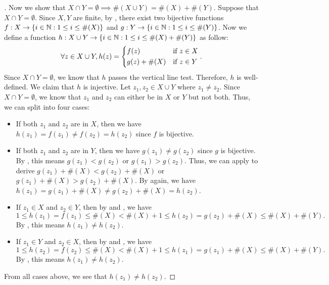\begin{proof}[]
  Now we show that \(X \cap Y = \emptyset \implies \#(X \cup Y) = \#(X) + \#(Y)\).
  Suppose that \(X \cap Y = \emptyset\).
  Since \(X, Y\) are finite, by , there exist two bijective functions \(f : X \to \left\lbrace i \in \mathbb{N} : 1 \leq i \leq \#(X)\right\rbrace\) and \(g : Y \to \left\lbrace i \in \mathbb{N} : 1 \leq i \leq \#(Y)\right\rbrace\).
  Now we define a function \(h : X \cup Y \to \left\lbrace i \in \mathbb{N} : 1 \leq i \leq \#(X) + \#(Y)\right\rbrace\) as follow:
  \[
    \forall z \in X \cup Y, h(z) = \begin{dcases}
      f(z)         & \text{if } z \in X \\
      g(z) + \#(X) & \text{if } z \in Y
    \end{dcases}.
  \]
  Since \(X \cap Y = \emptyset\), we know that \(h\) passes the vertical line test.
  Therefore, \(h\) is well-defined.
  We claim that \(h\) is injective.
  Let \(z_1, z_2 \in X \cup Y\) where \(z_1 \neq z_2\).
  Since \(X \cap Y = \emptyset\), we know that \(z_1\) and \(z_2\) can either be in \(X\) or \(Y\) but not both.
  Thus, we can split into four cases:
  \begin{itemize}
    \item If both \(z_1\) and \(z_2\) are in \(X\), then we have \(h(z_1) = f(z_1) \neq f(z_2) = h(z_2)\) since \(f\) is bijective.
    \item If both \(z_1\) and \(z_2\) are in \(Y\), then we have \(g(z_1) \neq g(z_2)\) since \(g\) is bijective.
          By , this means \(g(z_1) < g(z_2)\) or \(g(z_1) > g(z_2)\).
          Thus, we can apply  to derive \(g(z_1) + \#(X) < g(z_2) + \#(X)\) or \(g(z_1) + \#(X) > g(z_2) + \#(X)\).
          By  again, we have \(h(z_1) = g(z_1) + \#(X) \neq g(z_2) + \#(X) = h(z_2)\).
    \item If \(z_1 \in X\) and \(z_2 \in Y\), then by  and , we have
          \[
            1 \leq h(z_1) = f(z_1) \leq \#(X) < \#(X) + 1 \leq h(z_2) = g(z_2) + \#(X) \leq \#(X) + \#(Y).
          \]
          By , this means \(h(z_1) \neq h(z_2)\).
    \item If \(z_1 \in Y\) and \(z_2 \in X\), then by  and , we have
          \[
            1 \leq h(z_2) = f(z_2) \leq \#(X) < \#(X) + 1 \leq h(z_1) = g(z_1) + \#(X) \leq \#(X) + \#(Y).
          \]
          By , this means \(h(z_1) \neq h(z_2)\).
  \end{itemize}
  From all cases above, we see that \(h(z_1) \neq h(z_2)\).

\end{proof}
